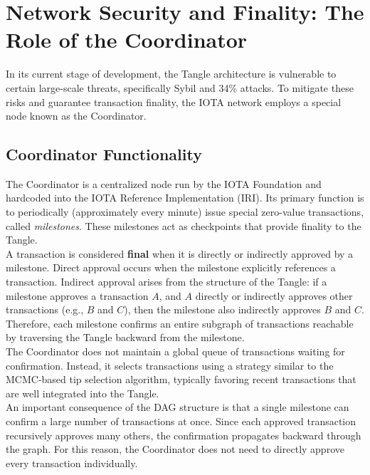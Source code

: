 \documentclass{scrbook}
\begin{document}
\section{Network Security and Finality: The Role of the Coordinator}

In its current stage of development, the Tangle architecture is vulnerable to certain large-scale threats, specifically Sybil and 34\% attacks. To mitigate these risks and guarantee transaction finality, the IOTA network employs a special node known as the Coordinator.

\subsection{Coordinator Functionality}

The Coordinator is a centralized node run by the IOTA Foundation and hardcoded into the IOTA Reference Implementation (IRI). Its primary function is to periodically (approximately every minute) issue special zero-value transactions, called \textit{milestones}. These milestones act as checkpoints that provide finality to the Tangle.\\

A transaction is considered \textbf{final} when it is directly or indirectly approved by a milestone. Direct approval occurs when the milestone explicitly references a transaction. Indirect approval arises from the structure of the Tangle: if a milestone approves a transaction $A$, and $A$ directly or indirectly approves other transactions (e.g., $B$ and $C$), then the milestone also indirectly approves $B$ and $C$. Therefore, each milestone confirms an entire subgraph of transactions reachable by traversing the Tangle backward from the milestone.\\

The Coordinator does not maintain a global queue of transactions waiting for confirmation. Instead, it selects transactions using a strategy similar to the MCMC-based tip selection algorithm, typically favoring recent transactions that are well integrated into the Tangle.\\

An important consequence of the DAG structure is that a single milestone can confirm a large number of transactions at once. Since each approved transaction recursively approves many others, the confirmation propagates backward through the graph. For this reason, the Coordinator does not need to directly approve every transaction individually.\\
\end{document}
